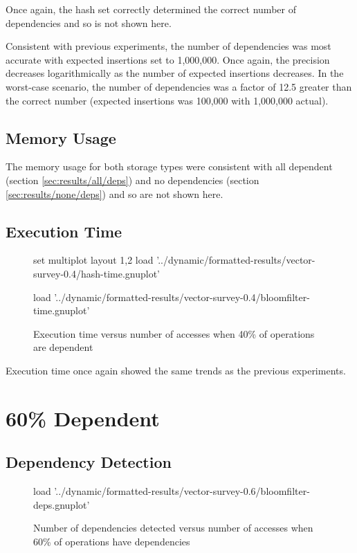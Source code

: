 	Once again, the hash set correctly determined the correct number of dependencies and so is not shown here.
		
	Consistent with previous experiments, the number of dependencies was most accurate with expected insertions set to 1,000,000. Once again, the precision decreases logarithmically as the number of expected insertions decreases. In the worst-case scenario, the number of dependencies was a factor of 12.5 greater than the correct number (expected insertions was 100,000 with 1,000,000 actual).
	
	\subsection{Memory Usage} \label{sec:results/40/mem}
	The memory usage for both storage types were consistent with all dependent (section \ref{sec:results/all/deps}) and no dependencies (section \ref{sec:results/none/deps}) and so are not shown here.
	
	\subsection{Execution Time} \label{sec:results/40/time}
	\begin{figure}
		\centering
		\begin{gnuplot}[terminal=pdf]
			set multiplot layout 1,2
				load '../dynamic/formatted-results/vector-survey-0.4/hash-time.gnuplot'
				
				load '../dynamic/formatted-results/vector-survey-0.4/bloomfilter-time.gnuplot'
		\end{gnuplot}
		\caption{Execution time versus number of accesses when 40\% of operations are dependent}
		\label{chart:40-time}
	\end{figure}
	
	Execution time once again showed the same trends as the previous experiments.
	
\section{60\% Dependent} \label{sec:results/60}
	\subsection{Dependency Detection} \label{sec:results/60/deps}
	\begin{figure}
		\centering
		\begin{gnuplot}[terminal=pdf]
			load '../dynamic/formatted-results/vector-survey-0.6/bloomfilter-deps.gnuplot'
		\end{gnuplot}
		\caption{Number of dependencies detected versus number of accesses when 60\% of operations have dependencies}
		\label{chart:60-dep}
	\end{figure}
	
